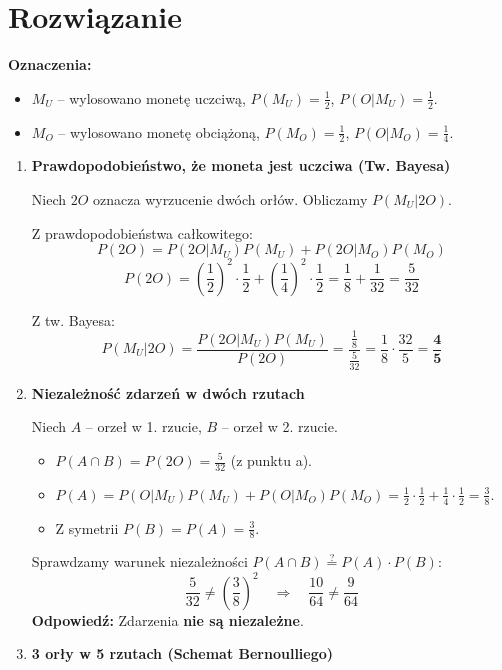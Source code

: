 \documentclass[polish, 10pt]{extarticle}
\theoremstyle{definition}
\begin{document}
\section*{Rozwiązanie}

\textbf{Oznaczenia:}
\begin{itemize}
    \item $M_U$ – wylosowano monetę uczciwą, $P(M_U) = \frac{1}{2}$, $P(O|M_U) = \frac{1}{2}$.
    \item $M_O$ – wylosowano monetę obciążoną, $P(M_O) = \frac{1}{2}$, $P(O|M_O) = \frac{1}{4}$.
\end{itemize}

\begin{enumerate}[label=\alph*)]
    \item \textbf{Prawdopodobieństwo, że moneta jest uczciwa (Tw. Bayesa)}
    
    Niech $2O$ oznacza wyrzucenie dwóch orłów. Obliczamy $P(M_U|2O)$.
    
    Z prawdopodobieństwa całkowitego:
    \[
    P(2O) = P(2O|M_U)P(M_U) + P(2O|M_O)P(M_O)
    \]
    \[
    P(2O) = \left(\frac{1}{2}\right)^2 \cdot \frac{1}{2} + \left(\frac{1}{4}\right)^2 \cdot \frac{1}{2} = \frac{1}{8} + \frac{1}{32} = \frac{5}{32}
    \]
    
    Z tw. Bayesa:
    \[
    P(M_U|2O) = \frac{P(2O|M_U)P(M_U)}{P(2O)} = \frac{\frac{1}{8}}{\frac{5}{32}} = \frac{1}{8} \cdot \frac{32}{5} = \mathbf{\frac{4}{5}}
    \]

    \item \textbf{Niezależność zdarzeń w dwóch rzutach}
    
    Niech $A$ – orzeł w 1. rzucie, $B$ – orzeł w 2. rzucie.
    \begin{itemize}
        \item $P(A \cap B) = P(2O) = \frac{5}{32}$ (z punktu a).
        \item $P(A) = P(O|M_U)P(M_U) + P(O|M_O)P(M_O) = \frac{1}{2}\cdot\frac{1}{2} + \frac{1}{4}\cdot\frac{1}{2} = \frac{3}{8}$.
        \item Z symetrii $P(B) = P(A) = \frac{3}{8}$.
    \end{itemize}
    Sprawdzamy warunek niezależności $P(A \cap B) \stackrel{?}{=} P(A) \cdot P(B)$:
    \[
    \frac{5}{32} \neq \left(\frac{3}{8}\right)^2 \quad \Rightarrow \quad \frac{10}{64} \neq \frac{9}{64}
    \]
    \textbf{Odpowiedź:} Zdarzenia \textbf{nie są niezależne}.

    \item \textbf{3 orły w 5 rzutach (Schemat Bernoulliego)}
    

\end{enumerate}
\end{document}
